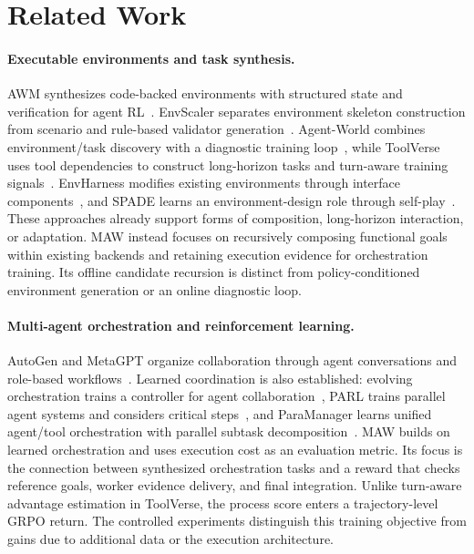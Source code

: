 \section{Related Work}
\label{sec:related-work}

\paragraph{Executable environments and task synthesis.}
AWM synthesizes code-backed environments with structured state and verification for agent RL~\citep{wang2026agentworldmodelinfinity}. EnvScaler separates environment skeleton construction from scenario and rule-based validator generation~\citep{song2026envscaler}. Agent-World combines environment/task discovery with a diagnostic training loop~\citep{dong2026agentworld}, while ToolVerse uses tool dependencies to construct long-horizon tasks and turn-aware training signals~\citep{zhou2026toolverse}. EnvHarness modifies existing environments through interface components~\citep{huang2026envharness}, and SPADE learns an environment-design role through self-play~\citep{liu2026spade}. These approaches already support forms of composition, long-horizon interaction, or adaptation. MAW instead focuses on recursively composing functional goals within existing backends and retaining execution evidence for orchestration training. Its offline candidate recursion is distinct from policy-conditioned environment generation or an online diagnostic loop.

\paragraph{Multi-agent orchestration and reinforcement learning.}
AutoGen and MetaGPT organize collaboration through agent conversations and role-based workflows~\citep{wu2023autogen,hong2023metagpt}. Learned coordination is also established: evolving orchestration trains a controller for agent collaboration~\citep{dang2025orchestration}, PARL trains parallel agent systems and considers critical steps~\citep{kimiteam2026kimik25}, and ParaManager learns unified agent/tool orchestration with parallel subtask decomposition~\citep{yuan2026paramanager}. MAW builds on learned orchestration and uses execution cost as an evaluation metric. Its focus is the connection between synthesized orchestration tasks and a reward that checks reference goals, worker evidence delivery, and final integration. Unlike turn-aware advantage estimation in ToolVerse, the process score enters a trajectory-level GRPO return. The controlled experiments distinguish this training objective from gains due to additional data or the execution architecture.
